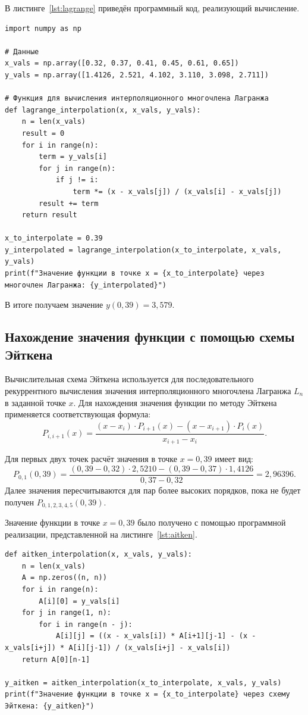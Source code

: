 \documentclass[a4paper, final]{article}
\begin{document}
В листинге~\ref{lst:lagrange} приведён программный код, реализующий вычисление.

\begin{lstlisting}[caption={Вычисление значения функции с помощью многочлена Лагранжа}, label=lst:lagrange]
import numpy as np

# Данные
x_vals = np.array([0.32, 0.37, 0.41, 0.45, 0.61, 0.65])
y_vals = np.array([1.4126, 2.521, 4.102, 3.110, 3.098, 2.711])

# Функция для вычисления интерполяционного многочлена Лагранжа
def lagrange_interpolation(x, x_vals, y_vals):
    n = len(x_vals)
    result = 0
    for i in range(n):
        term = y_vals[i]
        for j in range(n):
            if j != i:
                term *= (x - x_vals[j]) / (x_vals[i] - x_vals[j])
        result += term
    return result

x_to_interpolate = 0.39
y_interpolated = lagrange_interpolation(x_to_interpolate, x_vals, y_vals)
print(f"Значение функции в точке x = {x_to_interpolate} через многочлен Лагранжа: {y_interpolated}")
\end{lstlisting}

В итоге получаем значение \(y(0{,}39) = 3{,}579\). 

\subsection{Нахождение значения функции с помощью схемы Эйткена}

Вычислительная схема Эйткена используется для последовательного рекуррентного вычисления значения интерполяционного многочлена Лагранжа \(L_n\) в заданной точке \(x\). Для нахождения значения функции по методу Эйткена применяется соответствующая формула:
\[
P_{i, i+1}(x) = \frac{(x - x_i) \cdot P_{i+1}(x) - (x - x_{i+1}) \cdot P_i(x)}{x_{i+1} - x_i}.
\]

Для первых двух точек расчёт значения в точке $x = 0{,}39$ имеет вид:
\[
P_{0,1}(0{,}39) = \frac{(0{,}39 - 0{,}32) \cdot 2{,}5210 - (0{,}39 - 0{,}37) \cdot 1{,}4126}{0{,}37 - 0{,}32} = 2{,}96396.
\]
Далее значения пересчитываются для пар более высоких порядков, пока не будет получен $P_{0,1,2,3,4,5}(0{,}39)$.

Значение функции в точке \(x = 0{,}39\) было получено с помощью программной реализации, представленной на листинге~\ref{lst:aitken}.

\begin{lstlisting}[caption={Вычисление значения функции с помощью схемы Эйткена}, label=lst:aitken]
def aitken_interpolation(x, x_vals, y_vals):
    n = len(x_vals)
    A = np.zeros((n, n))
    for i in range(n):
        A[i][0] = y_vals[i]
    for j in range(1, n):
        for i in range(n - j):
            A[i][j] = ((x - x_vals[i]) * A[i+1][j-1] - (x - x_vals[i+j]) * A[i][j-1]) / (x_vals[i+j] - x_vals[i])
    return A[0][n-1]

y_aitken = aitken_interpolation(x_to_interpolate, x_vals, y_vals)
print(f"Значение функции в точке x = {x_to_interpolate} через схему Эйткена: {y_aitken}")
\end{lstlisting}
\end{document}

